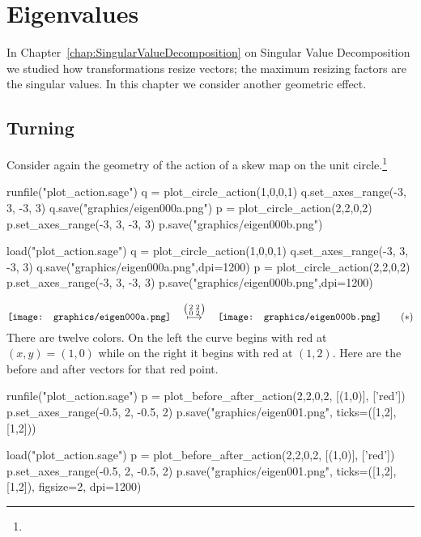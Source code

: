 \chapter{Eigenvalues}

In Chapter~\ref{chap:SingularValueDecomposition} on 
Singular Value Decomposition we studied how
transformations resize vectors; the maximum resizing factors
are the singular values.
In this chapter we consider another geometric effect.


\section{Turning}
Consider again the geometry of the action of a skew map on the unit 
circle.\footnote{\noterightmult}
\begin{sageoutput}
runfile("plot_action.sage")  
q = plot_circle_action(1,0,0,1) 
q.set_axes_range(-3, 3, -3, 3) 
q.save("graphics/eigen000a.png")
p = plot_circle_action(2,2,0,2) 
p.set_axes_range(-3, 3, -3, 3) 
p.save("graphics/eigen000b.png")
\end{sageoutput}
\begin{sagesilent}
load("plot_action.sage")  
q = plot_circle_action(1,0,0,1) 
q.set_axes_range(-3, 3, -3, 3) 
q.save("graphics/eigen000a.png",dpi=1200)
p = plot_circle_action(2,2,0,2) 
p.set_axes_range(-3, 3, -3, 3) 
p.save("graphics/eigen000b.png",dpi=1200)
\end{sagesilent}
\begin{equation*} \label{gr:firstgraphic}
  \vcenteredhbox{\texttt{[image: graphics/eigen000a.png]}}
  \quad\mapsunder{\big (\begin{smallmatrix} 2 &2 \\ 0 &2 \end{smallmatrix}\big )}\quad
  \vcenteredhbox{\texttt{[image: graphics/eigen000b.png]}}
  \tag{$*$}
\end{equation*}
There are twelve colors.
On the left the curve begins with red at $(x,y)=(1,0)$
while on the right it begins with red at $(1,2)$.
Here are the before and after vectors for that red point.
\begin{sageoutput}[d,0,1;d,2,4]
runfile("plot_action.sage")  
p = plot_before_after_action(2,2,0,2, [(1,0)], ['red']) 
p.set_axes_range(-0.5, 2, -0.5, 2) 
p.save("graphics/eigen001.png", ticks=([1,2],[1,2]))
\end{sageoutput}
\begin{sagesilent}
load("plot_action.sage")  
p = plot_before_after_action(2,2,0,2, [(1,0)], ['red']) 
p.set_axes_range(-0.5, 2, -0.5, 2) 
p.save("graphics/eigen001.png", ticks=([1,2],[1,2]), figsize=2, dpi=1200)
\end{sagesilent}
